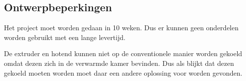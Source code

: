 \subsection{Ontwerpbeperkingen}

Het project moet worden gedaan in 10 weken. Dus er kunnen geen onderdelen
worden gebruikt met een lange levertijd.

De extruder en hotend kunnen niet op de conventionele manier worden gekoeld
omdat dezen zich in de verwarmde kamer bevinden. Dus als blijkt dat dezen
gekoeld moeten worden moet daar een andere oplossing voor worden gevonden.